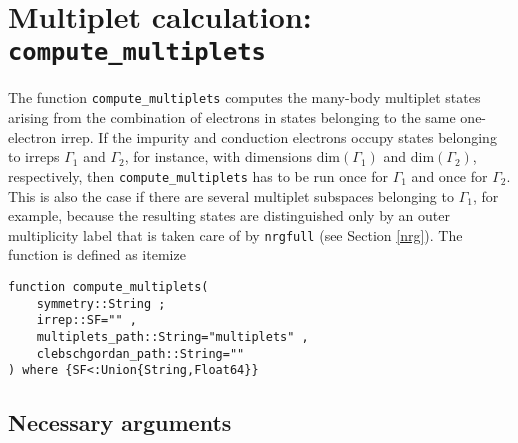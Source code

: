 \documentclass[notitlepage]{article}
\begin{document}
\section{Multiplet calculation: \texttt{compute\_multiplets}}
\label{multiplet_calculation}
The function \texttt{compute\_multiplets} computes the
many-body multiplet states arising from the combination of
electrons in states belonging to the same one-electron
irrep. If the impurity and conduction electrons occupy
states belonging to irreps $\Gamma_1$ and $\Gamma_2$, for
instance, with dimensions $\text{dim}(\Gamma_1)$ and
$\text{dim}(\Gamma_2)$, respectively, then
\texttt{compute\_multiplets} has to be run once for
$\Gamma_1$ and once for $\Gamma_2$. This is also the case if
there are several multiplet subspaces belonging to
$\Gamma_1$, for example, because the resulting states are
distinguished only by an outer multiplicity label that is
taken care of by \texttt{nrgfull} (see Section
\ref{nrg}). The function is defined as
itemize\begin{verbatim}
function compute_multiplets( 
    symmetry::String ;
    irrep::SF="" ,
    multiplets_path::String="multiplets" ,
    clebschgordan_path::String=""
) where {SF<:Union{String,Float64}}
\end{verbatim}
\subsection{Necessary arguments}
\end{document}
